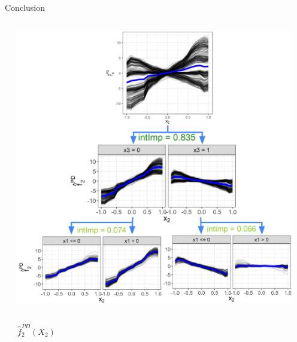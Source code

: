 \begin{frame}{Conclusion}
\begin{columns}[T, totalwidth = \textwidth]
\begin{column}{0.53\textwidth}
        \end{column}
        \begin{column}{0.45\textwidth}
        \centering
        \includegraphics[width=0.95\textwidth]{figure/sim1}
        \vspace{-8pt}
            \begin{columns}[T, totalwidth = \linewidth]
         \footnotesize
                \begin{column}{0.125\linewidth}
                \centering
                 $\hat{f}_2^{PD}(X_2)$ %
             \end{column}
             \begin{column}{0.175\linewidth}

\end{column}
\end{columns}
\end{column}
\end{columns}
\end{frame}
